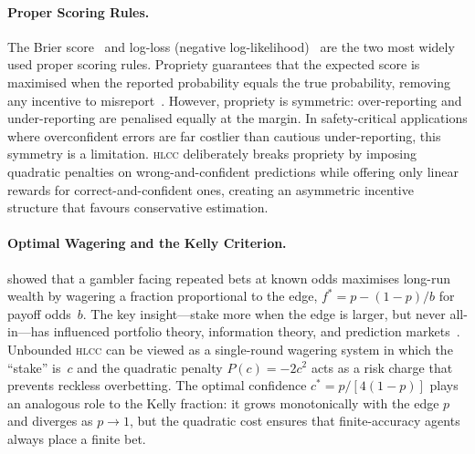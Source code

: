 \documentclass[11pt,a4paper]{article}
\newcommand{\hlcc}{\textsc{hlcc}}
\newcommand{\cstar}{c^{*}}
\begin{document}
\paragraph{Proper Scoring Rules.}
The Brier score~\cite{brier1950verification} and log-loss (negative
log-likelihood)~\cite{good1952} are the two most widely used proper
scoring rules.  Propriety guarantees that the expected score is
maximised when the reported probability equals the true probability,
removing any incentive to misreport~\cite{gneiting2007strictly}.
However, propriety is symmetric: over-reporting and under-reporting
are penalised equally at the margin.  In safety-critical applications
where overconfident errors are far costlier than cautious
under-reporting, this symmetry is a
limitation.  \hlcc{} deliberately breaks propriety by imposing
quadratic penalties on wrong-and-confident predictions while offering
only linear rewards for correct-and-confident ones, creating an
asymmetric incentive structure that favours conservative estimation.

\paragraph{Optimal Wagering and the Kelly Criterion.}
\citet{kelly1956} showed that a gambler facing repeated bets at known
odds maximises long-run wealth by wagering a fraction proportional to
the edge, $f^{*} = p - (1{-}p)/b$ for payoff odds~$b$.  The key
insight---stake more when the edge is larger, but never all-in---has
influenced portfolio theory, information theory, and
prediction markets~\cite{cover2006elements}.
Unbounded \hlcc{} can be viewed as a single-round wagering system
in which the ``stake'' is~$c$ and the quadratic penalty
$P(c) = -2c^{2}$ acts as a risk charge that prevents reckless
overbetting.  The optimal confidence $\cstar = p/[4(1{-}p)]$ plays an
analogous role to the Kelly fraction: it grows monotonically with the
edge $p$ and diverges as $p \to 1$, but the quadratic cost ensures
that finite-accuracy agents always place a finite bet.
\end{document}

